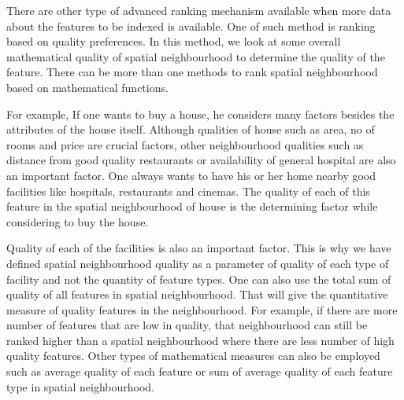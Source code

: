 There are other type of advanced ranking mechanism available when more data about the features to be indexed is available. One of such method is ranking based on quality preferences. In this method, we look at some overall mathematical quality of spatial neighbourhood to determine the quality of the feature. There can be more than one methods to rank spatial neighbourhood based on mathematical functions.
\newline
\par For example, If one wants to buy a house, he considers many factors besides the attributes of the house itself. Although qualities of house such as area, no of rooms and price are crucial factors, other neighbourhood qualities such as distance from good quality restaurants or availability of general hospital are also an important factor. One always wants to have his or her home nearby good facilities like hospitals, restaurants and cinemas. The quality of each of this feature in the spatial neighbourhood of house is the determining factor while considering to buy the house.
\newline
\par Quality of each of the facilities is also an important factor. This is why we have defined spatial neighbourhood quality as a parameter of quality of each type of facility and not the quantity of feature types. One can also use the total sum of quality of all features in spatial neighbourhood. That will give the quantitative measure of quality features in the neighbourhood. For example, if there are more number of features that are low in quality, that neighbourhood can still be ranked higher than a spatial neighbourhood where there are less number of high quality features. Other types of mathematical measures can also be employed such as average quality of each feature or sum of average quality of each feature type in spatial neighbourhood. 


